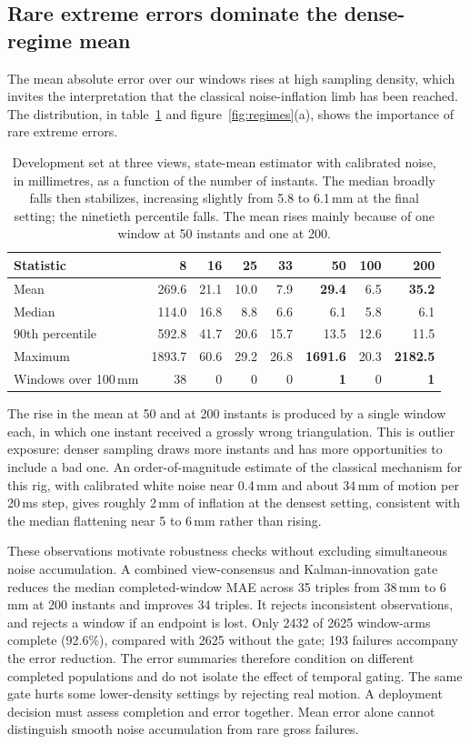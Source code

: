 \documentclass{iopjournal}
\begin{document}
\subsection{Rare extreme errors dominate the dense-regime mean}
\label{sec:outliers}
The mean absolute error over our windows rises at high sampling density, which
invites the interpretation that the classical noise-inflation limb has been
reached. The distribution, in table~\ref{tab:outliers} and
figure~\ref{fig:regimes}(a), shows the importance of rare extreme errors.

\begin{table}
\caption{Development set at three views, state-mean estimator with calibrated
noise, in millimetres, as a function of the number of instants. The median broadly falls then stabilizes, increasing slightly from
5.8 to 6.1\,mm at the final setting; the ninetieth percentile falls. The
mean rises mainly because of one window at 50 instants and one at 200.}
\centering
\begin{tabular}{lrrrrrrr}
\hline
Statistic & 8 & 16 & 25 & 33 & 50 & 100 & 200\\
\hline
Mean & 269.6 & 21.1 & 10.0 & 7.9 & \textbf{29.4} & 6.5 & \textbf{35.2}\\
Median & 114.0 & 16.8 & 8.8 & 6.6 & 6.1 & 5.8 & 6.1\\
90th percentile & 592.8 & 41.7 & 20.6 & 15.7 & 13.5 & 12.6 & 11.5\\
Maximum & 1893.7 & 60.6 & 29.2 & 26.8 & \textbf{1691.6} & 20.3 & \textbf{2182.5}\\
Windows over 100\,mm & 38 & 0 & 0 & 0 & \textbf{1} & 0 & \textbf{1}\\
\hline
\end{tabular}
\label{tab:outliers}
\end{table}

The rise in the mean at 50 and at 200 instants is produced by a single window
each, in which one instant received a grossly wrong triangulation. This is
outlier exposure: denser sampling draws more instants and has more
opportunities to include a bad one. An order-of-magnitude estimate of the
classical mechanism for this rig, with calibrated white noise near 0.4\,mm and
about 34\,mm of motion per 20\,ms step, gives roughly 2\,mm of inflation at
the densest setting, consistent with the median flattening near 5 to 6\,mm
rather than rising.

These observations motivate robustness checks without excluding simultaneous
noise accumulation. A combined view-consensus and Kalman-innovation gate
reduces the median completed-window MAE across 35 triples from 38\,mm to
6\,mm at 200 instants and improves 34 triples. It rejects inconsistent
observations, and rejects a window if an endpoint is lost. Only 2432 of
2625 window-arms complete (92.6\%), compared with 2625 without the gate;
193 failures accompany the error reduction. The error summaries therefore
condition on different completed populations and do not isolate the effect
of temporal gating. The same gate hurts some lower-density settings by
rejecting real motion. A deployment decision must assess completion and error
together. Mean error alone cannot distinguish smooth noise accumulation from
rare gross failures.
\end{document}
